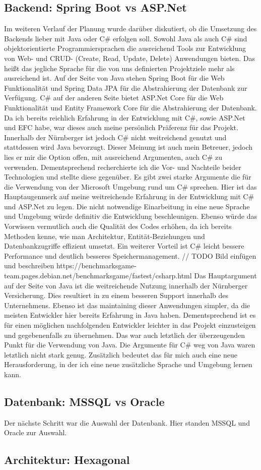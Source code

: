 \subsection{Backend: Spring Boot vs ASP.Net}
Im weiteren Verlauf der Planung wurde darüber diskutiert, ob die Umsetzung des Backends lieber mit Java oder C\# erfolgen soll. 
Sowohl Java als auch C\# sind objektorientierte Programmiersprachen die ausreichend Tools zur Entwicklung von Web- und CRUD- (Create, Read, Update, Delete) Anwendungen bieten.
Das heißt das jegliche Sprache für die von uns definierten Projektziele mehr als ausreichend ist.
Auf der Seite von Java stehen Spring Boot für die Web Funktionalität und Spring Data JPA für die Abstrahierung der Datenbank zur Verfügung.
C\# auf der anderen Seite bietet ASP.Net Core für die Web Funktionalität und Entity Framework Core für die Abstrahierung der Datenbank.
Da ich bereits reichlich Erfahrung in der Entwicklung mit C\#, sowie ASP.Net und EFC habe, war dieses auch meine persönlich Präferenz für das Projekt.
Innerhalb der Nürnberger ist jedoch C\# nicht weitreichend genutzt und stattdessen wird Java bevorzugt. Dieser Meinung ist auch mein Betreuer, jedoch lies er mir die Option offen, mit 
ausreichend Argumenten, auch C\# zu verwenden. 
Dementsprechend recherchierte ich die Vor- und Nachteile beider Technologien und stellte diese gegenüber.
Es gibt zwei starke Argumente die für die Verwendung von der Microsoft Umgebung rund um C\# sprechen.
Hier ist das Hauptaugenmerk auf meine weitreichende Erfahrung in der Entwicklung mit C\# und ASP.Net zu legen.
Die nicht notwendige Einarbeitung in eine neue Sprache und Umgebung würde definitiv die Entwicklung beschleunigen.
Ebenso würde das Vorwissen vermutlich auch die Qualität des Codes erhöhen, da ich bereits Methoden kenne, wie man Architektur, Entität-Beziehungen und Datenbankzugriffe effizient umsetzt.
Ein weiterer Vorteil ist C\# leicht bessere Performance und deutlich besseres Speichermanagement. 
// TODO Bild einfügen und beschreiben
https://benchmarksgame-team.pages.debian.net/benchmarksgame/fastest/csharp.html
Das Hauptargument auf der Seite von Java ist die weitreichende Nutzung innerhalb der Nürnberger Versicherung. Dies resultiert in zu einem besseren Support innerhalb des Unternehmens.
Ebenso ist das maintaining dieser Anwendungen simpler, da die meisten Entwickler hier bereits Erfahrung in Java haben. Dementsprechend ist es für einen möglichen nachfolgenden Entwickler leichter
in das Projekt einzusteigen und gegebenenfalls zu übernehmen.
Das war auch letztlich der überzeugenden Punkt für die Verwendung von Java. Die Argumente für C\# weg von Java waren letztlich nicht stark genug.
Zusätzlich bedeutet das für mich auch eine neue Herausforderung, in der ich eine neue zusätzliche Sprache und Umgebung lernen kann.

\subsection{Datenbank: MSSQL vs Oracle}
Der nächste Schritt war die Auswahl der Datenbank. Hier standen MSSQL und Oracle zur Auswahl.
\subsection{Architektur: Hexagonal}

